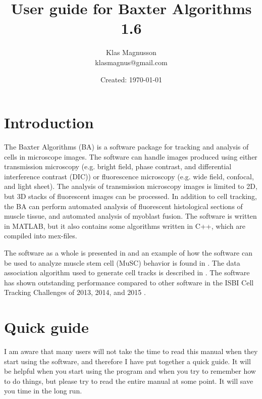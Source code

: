 \documentclass[a4paper, oneside, onecolumn, 11pt]{article}
\title{User guide for Baxter Algorithms 1.6}
\author{Klas Magnusson \\ klasmagnus@gmail.com}
\date{Created: \today}
\begin{document}
\setlength{\extrarowheight}{5pt}

\maketitle

\tableofcontents

\section{Introduction}
The Baxter Algorithms (BA) is a software package for tracking and analysis of cells in microscope images. The software can handle images produced using either transmission microscopy (e.g. bright field, phase contrast, and differential interference contrast (DIC)) or fluorescence microscopy (e.g. wide field, confocal, and light sheet). The analysis of transmission microscopy images is limited to 2D, but 3D stacks of fluorescent images can be processed. In addition to cell tracking, the BA can perform automated analysis of fluorescent histological sections of muscle tissue, and automated analysis of myoblast fusion. The software is written in MATLAB, but it also contains some algorithms written in C++, which are compiled into mex-files.

The software as a whole is presented in \cite{Magnusson16Thesis} and an example of how the software can be used to analyze muscle stem cell (MuSC) behavior is found in \cite{Gilbert10Elasticity}. The data association algorithm used to generate cell tracks is described in \cite{Magnusson12Viterbi, Magnusson15Viterbi}. The software has shown outstanding performance compared to other software in the ISBI Cell Tracking Challenges of 2013, 2014, and 2015 \cite{Maska14Benchmark, Ortiz15Challenge, Ulman17Objective}.

\section{Quick guide}
I am aware that many users will not take the time to read this manual when they start using the software, and therefore I have put together a quick guide. It will be helpful when you start using the program and when you try to remember how to do things, but please try to read the entire manual at some point. It will save you time in the long run.
\end{document}
